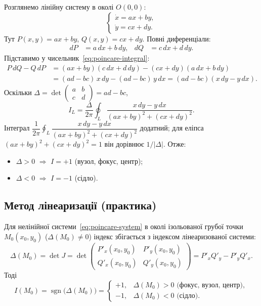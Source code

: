 \documentclass[12pt,a4paper]{article}
\DeclareMathOperator{\sgn}{sgn}
\begin{document}
Розглянемо лінійну систему в околі $O(0,0)$:
\begin{equation}\label{eq:linear-poincare}
\begin{cases}
  \dot{x} = ax + by,\\
  \dot{y} = cx + dy.
\end{cases}
\end{equation}
Тут $P(x,y)=ax+by$, $Q(x,y)=cx+dy$. Повні диференціали:
\begin{align*}
  dP &= a\,dx + b\,dy, &
  dQ &= c\,dx + d\,dy.
\end{align*}
Підставимо у чисельник~\eqref{eq:poincare-integral}:
\begin{align*}
  P\,dQ - Q\,dP
  &= (ax+by)(c\,dx+d\,dy) - (cx+dy)(a\,dx+b\,dy) \\
  &= (ad-bc)\,x\,dy - (ad-bc)\,y\,dx
   = (ad-bc)(x\,dy - y\,dx).
\end{align*}
Оскільки $\Delta=\det\begin{pmatrix}a&b\\c&d\end{pmatrix}=ad-bc$,
\begin{equation}\label{eq:poincare-linear}
  I_L = \frac{\Delta}{2\pi}\oint_L
  \frac{x\,dy - y\,dx}{(ax+by)^2+(cx+dy)^2}.
\end{equation}
Інтеграл $\dfrac{1}{2\pi}\oint_L \dfrac{x\,dy-y\,dx}{(ax+by)^2+(cx+dy)^2}$
додатний; для еліпса $(ax+by)^2+(cx+dy)^2=1$ він дорівнює $1/|\Delta|$. Отже:
\begin{itemize}[leftmargin=1.6em]
  \item $\Delta>0$ $\Rightarrow$ $I=+1$ (вузол, фокус, центр);
  \item $\Delta<0$ $\Rightarrow$ $I=-1$ (сідло).
\end{itemize}

\subsection{Метод лінеаризації (практика)}

Для нелінійної системи~\eqref{eq:poincare-system} в околі ізольованої
грубої точки $M_0(x_0,y_0)$ ($\Delta(M_0)\neq0$) індекс збігається з індексом
лінеаризованої системи:
\begin{equation}\label{eq:jacobian-det}
  \Delta(M_0)=\det J=
  \det\begin{pmatrix}
    P'_x(x_0,y_0) & P'_y(x_0,y_0)\\
    Q'_x(x_0,y_0) & Q'_y(x_0,y_0)
  \end{pmatrix}
  = P'_x Q'_y - P'_y Q'_x.
\end{equation}
Тоді
\begin{equation}\label{eq:index-sgn}
  I(M_0)=\sgn\bigl(\Delta(M_0)\bigr)=
  \begin{cases}
    +1, & \Delta(M_0)>0 \text{ (фокус, вузол, центр)},\\[0.2em]
    -1, & \Delta(M_0)<0 \text{ (сідло)}.
  \end{cases}
\end{equation}
\end{document}
